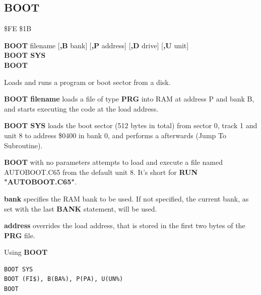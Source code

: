 
\newpage
\subsection{BOOT}
\begin{description}[leftmargin=2cm,style=nextline]
\item [Token:] \$FE \$1B
\item [Format:] {\bf BOOT} filename [{\bf,B} bank]
                [{\bf,P} address]  [{\bf,D} drive] [{\bf,U} unit]\\
                {\bf BOOT SYS} \\
                {\bf BOOT}
\item [Usage:]
   Loads and runs a program or boot sector from a disk.

   {\bf BOOT filename} loads a file of type
   {\bf PRG} into RAM at address P and bank B, and starts executing
   the code at the load address.

   {\bf BOOT SYS} loads the boot sector (512 bytes in total) from sector 0,
   track 1 and unit 8 to address \$0400 in bank 0, and
   performs a  afterwards (Jump To Subroutine).

   {\bf BOOT} with no parameters attempts to load
   and execute a file named AUTOBOOT.C65 from the default unit 8.
   It's short for {\bf RUN "AUTOBOOT.C65"}.

   \filenamedefinition

   {\bf bank} specifies the RAM bank to be used.
   If not specified, the current bank, as set with the last
   {\bf BANK} statement, will be used.

   {\bf address} overrides the load address,
   that is stored in the first two bytes of the {\bf PRG} file.

   \drivedefinition

   \unitdefinition

\item [Examples:] Using {\bf BOOT}
\begin{tcolorbox}[colback=black,coltext=white]
\verbatimfont{\codefont}
\begin{verbatim}
BOOT SYS
BOOT (FI$), B(BA%), P(PA), U(UN%)
BOOT
\end{verbatim}
\end{tcolorbox}
\end{description}

